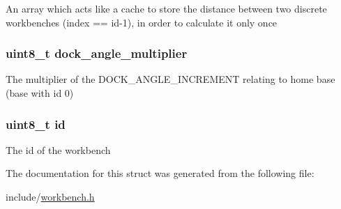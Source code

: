 \-An array which acts like a cache to store the distance between two discrete workbenches (index == id-\/1), in order to calculate it only once \hypertarget{structworkbench_ad9147c3eec2865f18724acafd59f7327}{
\subsubsection[{dock\-\_\-angle\-\_\-multiplier}]{\setlength{\rightskip}{0pt plus 5cm}uint8\-\_\-t {\bf dock\-\_\-angle\-\_\-multiplier}}}\label{structworkbench_ad9147c3eec2865f18724acafd59f7327}
\-The multiplier of the \-D\-O\-C\-K\-\_\-\-A\-N\-G\-L\-E\-\_\-\-I\-N\-C\-R\-E\-M\-E\-N\-T relating to home base (base with id 0) \hypertarget{structworkbench_a1e6927fa1486224044e568f9c370519b}{
\subsubsection[{id}]{\setlength{\rightskip}{0pt plus 5cm}uint8\-\_\-t {\bf id}}}\label{structworkbench_a1e6927fa1486224044e568f9c370519b}
\-The id of the workbench 

\-The documentation for this struct was generated from the following file\-:\begin{DoxyCompactItemize}
\item 
include/\hyperlink{workbench_8h}{workbench.\-h}\end{DoxyCompactItemize}
